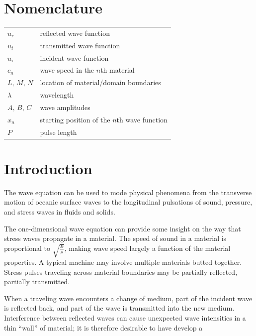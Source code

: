 \documentclass[twocolumn, letterpaper]{article}
\begin{document}
\section*{Nomenclature}
{\renewcommand\arraystretch{1.0}
\noindent\begin{supertabular}{@{}l @{\quad=\quad} l@{}}
$u_r$  &  reflected wave function\\
$u_t$ & transmitted wave function\\
$u_i$ & incident wave function \\
$c_n$ & wave speed in the $n$th material \\
$L\text{, }M\text{, } N$ & location of material/domain boundaries\\
$\lambda$ & wavelength\\
$A\text{, }B\text{, } C$ & wave amplitudes\\
$x_n$ & starting position of the $n$th wave function\\
$P$ & pulse length\\





\end{supertabular}}


\section*{Introduction}
The wave equation can be used to mode physical phenomena from the transverse motion of oceanic surface waves to the longitudinal pulsations of sound, pressure, and stress waves in fluids and solids. 

The one-dimensional wave equation can provide some insight on the way that stress waves propagate in a material. The speed of sound in a material is proportional to $\sqrt{\frac{E}{\rho}}$, making wave speed largely a function of the material properties. A typical machine may involve multiple materials butted together. Stress pulses traveling across material boundaries may be partially reflected, partially transmitted.

When a traveling  wave encounters a change of medium, part of the incident wave is reflected back, and part of the wave is transmitted into the new medium. Interference between reflected waves can cause unexpected wave intensities in a thin ``wall'' of material; it is therefore desirable to have develop a 
\end{document}
